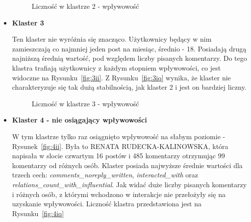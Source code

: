 \documentclass[polish,12pt]{aghthesis}
\begin{document}
\begin{itemize}
        \begin{figure}[ht] 
    \centering
    \hfill%
    \caption{Liczność w klastrze 2 - wpływowość}
    \label{f:2i}
    \end{figure}
    

    \item \textbf{Klaster 3}
    
Ten klaster nie wyróżnia się znacząco. Użytkownicy będący w nim zamieszczają co najmniej jeden post na miesiąc, średnio - 18. Posiadają drugą najniższą średnią wartość, pod względem liczby pisanych komentarzy. Do tego klastra trafiają użytkownicy z każdym stopniem wpływowości, co jest widoczne na Rysunku~\ref{fig:3ii}. Z Rysunku~\ref{fig:3iq} wynika, że klaster nie charakteryzuje się tak dużą stabilnością, jak klaster 2 i jest on bardziej liczny. 

        \begin{figure}[ht] 
    \centering
    \hfill%
    \caption{Liczność w klastrze 3 - wpływowość}
    \label{f:3i}
    \end{figure}

    
    \item \textbf{Klaster 4 - nie osiągający wpływowości}
    
W tym klastrze tylko raz osiągnięto wpływowość na słabym poziomie - Rysunek~\ref{fig:4ii}. Była to RENATA RUDECKA-KALINOWSKA, która napisała w slocie czwartym 16 postów i 485 komentarzy otrzymując 99 komentarzy od różnych osób. Klaster posiada najwyższe średnie wartości dla trzech cech: \textit{comments\_noreply\_written}, \textit{interacted\_with} oraz \textit{relations\_count\_with\_influential}. Jak widać duże liczby pisanych komentarzy i różnych osób, z którymi wchodzono w interakcje nie przełożyły się na uzyskanie wpływowości. Liczność klastra przedstawiona jest na Rysunku~\ref{fig:4iq}


\end{itemize}
\end{document}
